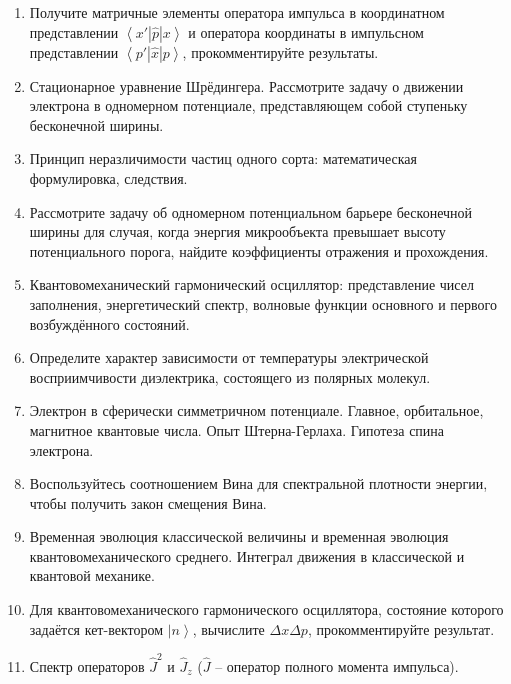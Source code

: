 \documentclass[12pt]{article}
\newcommand{\kL}[1]{\label{К-#1}}
\def\twodigits#1{%
\ifnum#1<10 0\fi 
\number#1}
\begin{document}
\begin{enumerate}[label={\textbf{К-\protect\twodigits{\theenumi}}}]
\item\kL{12}
Получите матричные элементы оператора импульса в координатном представлении $\left<x'|\hat{p}|x\right>$ и оператора координаты в импульсном представлении $\left<p'|\hat{x}|p\right>$, прокомментируйте результаты.

\item\kL{13}
Стационарное уравнение Шрёдингера. Рассмотрите задачу о движении электрона в одномерном потенциале, представляющем собой ступеньку бесконечной ширины.

\item\kL{14}
Принцип неразличимости частиц одного сорта: математическая формулировка, следствия.

\item\kL{15}
Рассмотрите задачу об одномерном потенциальном барьере бесконечной ширины для случая, когда энергия микрообъекта превышает высоту потенциального порога, найдите коэффициенты отражения и прохождения.

\item\kL{16}
Квантовомеханический гармонический осциллятор: представление чисел заполнения, энергетический спектр, волновые функции основного и первого возбуждённого состояний.

\item\kL{17}
Определите характер зависимости от температуры электрической восприимчивости диэлектрика, состоящего из полярных молекул.

\item\kL{18}
Электрон в сферически симметричном потенциале. Главное, орбитальное, магнитное квантовые числа. Опыт Штерна-Герлаха. Гипотеза спина электрона.

\item\kL{19}
Воспользуйтесь соотношением Вина для спектральной плотности энергии, чтобы получить закон смещения Вина.

\item\kL{20}
Временная эволюция классической величины и временная эволюция квантовомеханического среднего. Интеграл движения в классической и квантовой механике.

\item\kL{21}
Для квантовомеханического гармонического осциллятора, состояние которого задаётся кет-вектором $\left|n\right>$, вычислите $\Delta x\Delta p$, прокомментируйте результат.

\item\kL{22}
 Спектр операторов $\hat{J}^2$ и $\hat{J}_z$ ($\hat{J}$ -- оператор полного момента импульса).


\end{enumerate}
\end{document}
